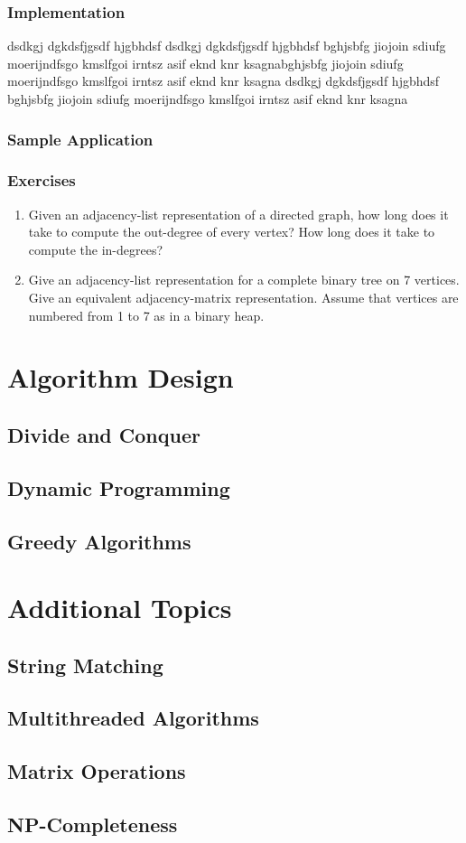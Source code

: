\documentclass[12pt,a4paper]{book}
\begin{document}
\section{Implementation}
dsdkgj dgkdsfjgsdf hjgbhdsf dsdkgj dgkdsfjgsdf hjgbhdsf bghjsbfg jiojoin sdiufg moerijndfsgo kmslfgoi irntsz asif eknd knr ksagnabghjsbfg jiojoin sdiufg moerijndfsgo kmslfgoi irntsz asif eknd knr ksagna dsdkgj dgkdsfjgsdf hjgbhdsf bghjsbfg jiojoin sdiufg moerijndfsgo kmslfgoi irntsz asif eknd knr ksagna
\section{Sample Application}
\section{Exercises}
\begin{enumerate}
\item Given an adjacency-list representation of a directed graph, how long does it take to compute the out-degree of every vertex? How long does it take to compute the in-degrees?
\item Give an adjacency-list representation for a complete binary tree on 7 vertices. Give an equivalent adjacency-matrix representation. Assume that vertices are numbered from 1 to 7 as in a binary heap.
\end{enumerate}
\part{Algorithm Design}
\chapter{Divide and Conquer}
\chapter{Dynamic Programming}
\chapter{Greedy Algorithms}
\part{Additional Topics}
\chapter{String Matching}
\chapter{Multithreaded Algorithms}
\chapter{Matrix Operations}
\chapter{NP-Completeness}
\end{document}
